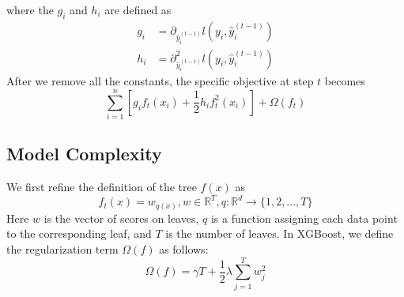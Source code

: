 \documentclass[a3paper, 12pt]{book} %
\begin{document}
where the $g_i$ and $h_i$ are defined as
\begin{equation}
\begin{split}g_i &= \partial_{\hat{y}_i^{(t-1)}} l(y_i, \hat{y}_i^{(t-1)})\\
h_i &= \partial_{\hat{y}_i^{(t-1)}}^2 l(y_i, \hat{y}_i^{(t-1)})\end{split}
\end{equation}
After we remove all the constants, the specific objective at step $t$ becomes
\begin{equation}
\sum_{i=1}^n [g_i f_t(x_i) + \frac{1}{2} h_i f_t^2(x_i)] + \Omega(f_t)
\end{equation}

\subsection{Model Complexity}
We first refine the definition of the tree $f(x)$ as 
$$f_t{(x)}=w_{q(x)}, w\in\mathbb{R}^{T}, q:\mathbb{R}^{d}\to\{1,2,...,T\}$$
Here $w$ is the vector of scores on leaves, $q$ is a function assigning each data point to the corresponding leaf, and $T$ is the number of leaves. In XGBoost, we define the regularization term $\Omega{(f)}$ as follows:
\begin{equation}
\Omega{(f)}=\gamma T+\frac{1}{2}\lambda\sum_{j=1}^{T}{w_j^2}
\end{equation}
\end{document}
